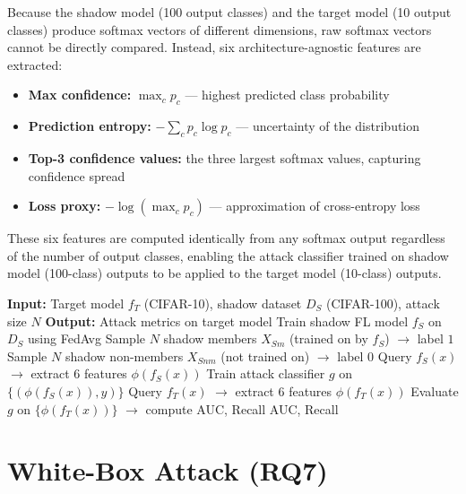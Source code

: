 \documentclass[12pt, a4paper]{report}
\begin{document}
\noindent Because the shadow model (100 output classes) and the target model (10
output classes) produce softmax vectors of different dimensions, raw softmax
vectors cannot be directly compared. Instead, six architecture-agnostic features
are extracted:

\begin{itemize}[leftmargin=1.5em, itemsep=2pt]
  \item \textbf{Max confidence:} $\max_c p_c$ --- highest predicted class probability
  \item \textbf{Prediction entropy:} $-\sum_c p_c \log p_c$ --- uncertainty of the distribution
  \item \textbf{Top-3 confidence values:} the three largest softmax values, capturing confidence spread
  \item \textbf{Loss proxy:} $-\log(\max_c p_c)$ --- approximation of cross-entropy loss
\end{itemize}

These six features are computed identically from any softmax output regardless
of the number of output classes, enabling the attack classifier trained on shadow
model (100-class) outputs to be applied to the target model (10-class) outputs.

\begin{algorithm}[H]
\caption{Shadow Model Membership Inference Attack}
\label{alg:shadow}
\begin{algorithmic}[1]
\State \textbf{Input:} Target model $f_T$ (CIFAR-10), shadow dataset $D_S$ (CIFAR-100), attack size $N$
\State \textbf{Output:} Attack metrics on target model
\State Train shadow FL model $f_S$ on $D_S$ using FedAvg
\State Sample $N$ shadow members $X_{Sm}$ (trained on by $f_S$) $\rightarrow$ label $1$
\State Sample $N$ shadow non-members $X_{Snm}$ (not trained on) $\rightarrow$ label $0$
    \State Query $f_S(x)$ $\rightarrow$ extract 6 features $\phi(f_S(x))$
\EndFor
\State Train attack classifier $g$ on $\{(\phi(f_S(x)), y)\}$
    \State Query $f_T(x)$ $\rightarrow$ extract 6 features $\phi(f_T(x))$
\EndFor
\State Evaluate $g$ on $\{\phi(f_T(x))\}$ $\rightarrow$ compute AUC, Recall
\State \Return AUC, Recall
\end{algorithmic}
\end{algorithm}

\section{White-Box Attack (RQ7)}
\end{document}
